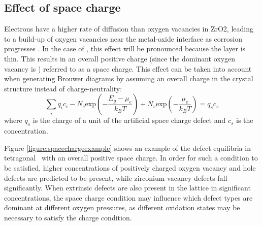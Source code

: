 \subsection{Effect of space charge} \label{space_charge}

Electrons have a higher rate of diffusion than oxygen vacancies in ZrO2, leading to a build-up of oxygen vacancies near the metal-oxide interface as corrosion progresses \cite{bojinov2010influence}. In the case of \zirconia , this effect will be pronounced because the layer is thin. This results in an overall positive charge (since the dominant oxygen vacancy is ) referred to as a space charge. This effect can be taken into account when generating Brouwer diagrams by assuming an overall charge in the crystal structure instead of charge-neutrality:
\begin{equation}
\sum_{i}q_{i}c_{i} - N_{c}\textrm{exp}{(-\frac{E_{g}-\mu_{e}}{k_{B}T})} + N_{v}\textrm{exp}{(-\frac{\mu_{e}}{k_{B}T})} = q_{s}c_{s}
\label{charge_non_neutrality}
\end{equation}
where $q_{s}$ is the charge of a unit of the artificial space charge defect and $c_{s}$ is the concentration.

Figure \ref{figure:spacechargeexample} shows an example of the defect equilibria in tetragonal \zirconia\ with an overall positive space charge. In order for such a condition to be satisfied, higher concentrations of positively charged oxygen vacancy and hole defects are predicted to be present, while zirconium vacancy defects fall significantly. When extrinsic defects are also present in the lattice in significant concentrations, the space charge condition may influence which defect types are dominant at different oxygen pressures, as different oxidation states may be necessary to satisfy the charge condition.


